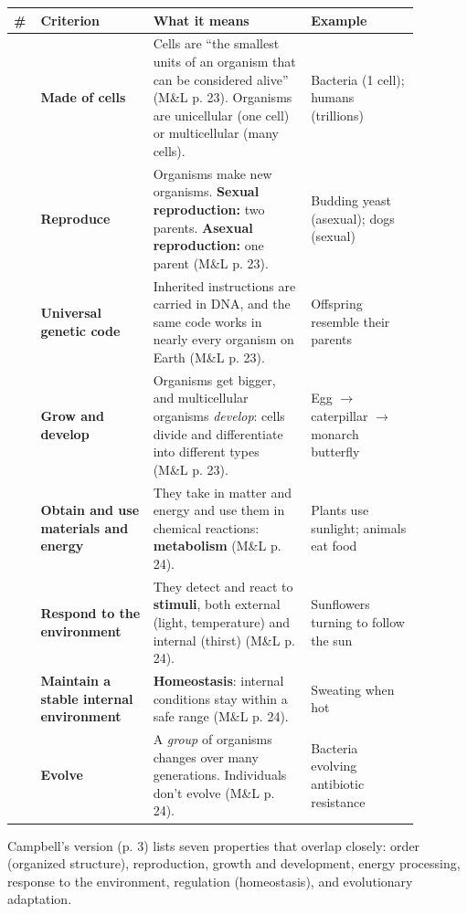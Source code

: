 \documentclass[11pt,letterpaper]{article}
\begin{document}
\begin{longtable}{@{}>{\raggedright\arraybackslash}p{0.04\linewidth}>{\raggedright\arraybackslash}p{0.25\linewidth}>{\raggedright\arraybackslash}p{0.35\linewidth}>{\raggedright\arraybackslash}p{0.24\linewidth}@{}}
\toprule
\# & Criterion & What it means & Example \\
\midrule
\endhead
1 & \textbf{Made of cells} & Cells are ``the smallest units of an organism that can be considered alive'' (M\&L p. 23). Organisms are unicellular (one cell) or multicellular (many cells). & Bacteria (1 cell); humans (trillions) \\
2 & \textbf{Reproduce} & Organisms make new organisms. \textbf{Sexual reproduction:} two parents. \textbf{Asexual reproduction:} one parent (M\&L p. 23). & Budding yeast (asexual); dogs (sexual) \\
3 & \textbf{Universal genetic code} & Inherited instructions are carried in DNA, and the same code works in nearly every organism on Earth (M\&L p. 23). & Offspring resemble their parents \\
4 & \textbf{Grow and develop} & Organisms get bigger, and multicellular organisms \emph{develop}: cells divide and differentiate into different types (M\&L p. 23). & Egg $\rightarrow$ caterpillar $\rightarrow$ monarch butterfly \\
5 & \textbf{Obtain and use materials and energy} & They take in matter and energy and use them in chemical reactions: \textbf{metabolism} (M\&L p. 24). & Plants use sunlight; animals eat food \\
6 & \textbf{Respond to the environment} & They detect and react to \textbf{stimuli}, both external (light, temperature) and internal (thirst) (M\&L p. 24). & Sunflowers turning to follow the sun \\
7 & \textbf{Maintain a stable internal environment} & \textbf{Homeostasis}: internal conditions stay within a safe range (M\&L p. 24). & Sweating when hot \\
8 & \textbf{Evolve} & A \emph{group} of organisms changes over many generations. Individuals don't evolve (M\&L p. 24). & Bacteria evolving antibiotic resistance \\
\bottomrule
\end{longtable}

Campbell's version (p. 3) lists seven properties that overlap closely: order (organized structure), reproduction, growth and development, energy processing, response to the environment, regulation (homeostasis), and evolutionary adaptation.
\end{document}
